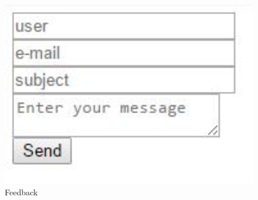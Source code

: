 \begin{figure}[!ht]
	
	\centering
	
	\includegraphics[width=1.0\textwidth]{Cattura8.JPG}
	
	\caption{Feedback}
	
	\label{Im_label}
	
\end{figure}

\clearpage